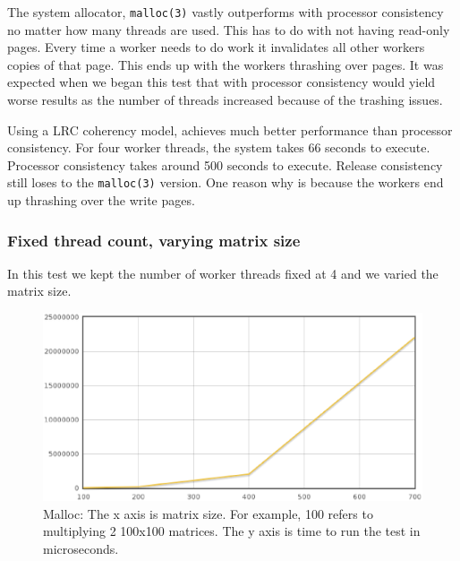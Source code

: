 The system allocator, \verb,malloc(3), vastly outperforms \projname{} with processor consistency no matter how many threads are used.  This has to do with not having read-only pages.  Every time a worker needs to do work it invalidates all other workers copies of that page.  This ends up with the workers thrashing over pages.  It was expected when we began this test that \projname{} with processor consistency would yield worse results as the number of threads increased because of the trashing issues.

Using a LRC coherency model, \projname{} achieves much better performance than processor consistency.  For four worker threads, the system takes 66 seconds to execute.  Processor consistency takes around 500 seconds to execute.  Release consistency still loses to the \verb,malloc(3), version.  One reason why is because the workers end up thrashing over the write pages.

\subsubsection{Fixed thread count, varying matrix size}

In this test we kept the number of worker threads fixed at 4 and we varied the matrix size.

\begin{figure}[!h]
\centering
\includegraphics[scale=0.40]{images/malloc-fixed-thread.eps}
\caption{Malloc: The x axis is matrix size. For example, 100 refers to multiplying 2 100x100 matrices. The y axis is time to run the test in microseconds.}
\end{figure}


